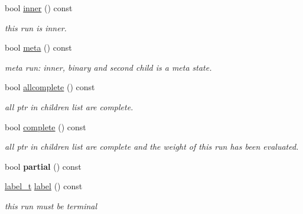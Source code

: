 \begin{DoxyCompactItemize}
bool \mbox{\hyperlink{classRun_a006c247eb8839a9a5045e53917e984c6}{inner}} () const
\begin{DoxyCompactList}\small\item\em this run is inner. \end{DoxyCompactList}\item 
\mbox{\label{classRun_a3fc5bc7196b967860f4c412bf47c8d9c}} 
bool \mbox{\hyperlink{classRun_a3fc5bc7196b967860f4c412bf47c8d9c}{meta}} () const
\begin{DoxyCompactList}\small\item\em meta run\+: inner, binary and second child is a meta state. \end{DoxyCompactList}\item 
\mbox{\label{classRun_abf33aa6674f2799357490fe893b7757a}} 
bool \mbox{\hyperlink{classRun_abf33aa6674f2799357490fe893b7757a}{allcomplete}} () const
\begin{DoxyCompactList}\small\item\em all ptr in children list are complete. \end{DoxyCompactList}\item 
\mbox{\label{classRun_a8b93caf0971738f454db7815db41501e}} 
bool \mbox{\hyperlink{classRun_a8b93caf0971738f454db7815db41501e}{complete}} () const
\begin{DoxyCompactList}\small\item\em all ptr in children list are complete and the weight of this run has been evaluated. \end{DoxyCompactList}\item 
\mbox{\label{classRun_a920c86e66e9189c7aebb8b449b2441ae}} 
bool {\bfseries partial} () const
\item 
\mbox{\label{classRun_ab0f5c4a978f33dd4e2df24174f6534f1}} 
\mbox{\hyperlink{group__output_ga22fde970e635fcf63962743b2d5c441d}{label\+\_\+t}} \mbox{\hyperlink{classRun_ab0f5c4a978f33dd4e2df24174f6534f1}{label}} () const
\begin{DoxyCompactList}\small\item\em this run must be terminal \end{DoxyCompactList}\item 
\mbox{\label{classRun_ab9eeb2e8033cf68b80099e56ddca8ff1}} 

\end{DoxyCompactItemize}
